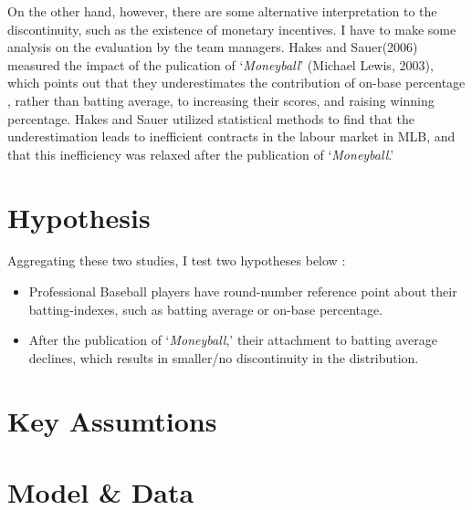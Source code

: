 \documentclass{jsarticle}[12pt]
\begin{document}
\hspace{1zw}On the other hand, however, there are some alternative interpretation to the discontinuity, such as the existence of monetary incentives. I have to make some analysis on the evaluation by the team managers. Hakes and Sauer(2006) measured the impact of the pulication of `\textit{Moneyball}' (Michael Lewis, 2003), which points out that they underestimates the contribution of on-base percentage , rather than batting average, to increasing their scores, and raising winning percentage.  Hakes and Sauer utilized statistical methods to find that the underestimation leads to inefficient contracts in the labour market in MLB, and that this inefficiency was relaxed after the publication of `\textit{Moneyball}.'

\section{Hypothesis}

\hspace{1zw}Aggregating these two studies, I test two hypotheses below :

 \begin{itemize}
 
 \item Professional Baseball players have round-number reference point about their batting-indexes, such as batting average or on-base percentage.
 
 \item After the publication of `\textit{Moneyball},' their attachment to batting average declines, which results in smaller/no discontinuity in the distribution.
 
 \end{itemize}

\section{Key Assumtions}



\section{Model \& Data}
\end{document}
